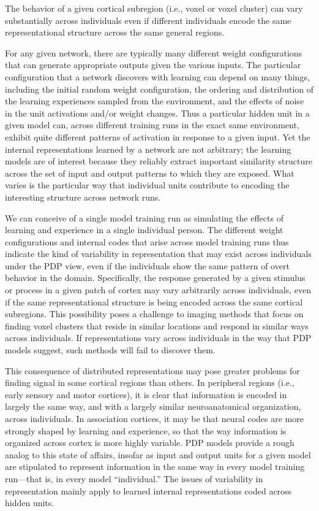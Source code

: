 \begin{APAenumerate}
\item The behavior of a given cortical subregion (i.e., voxel or voxel cluster) can vary substantially across individuals even if different individuals encode the same representational structure across the same general regions.

For any given network, there are typically many different weight configurations that can generate appropriate outputs given the various inputs. The particular configuration that a network discovers with learning can depend on many things, including the initial random weight configuration, the ordering and distribution of the learning experiences sampled from the environment, and the effects of noise in the unit activations and/or weight changes. Thus a particular hidden unit in a given model can, across different training runs in the exact same environment, exhibit quite different patterns of activation in response to a given input. Yet the internal representations learned by a network are not arbitrary; the learning models are of interest because they reliably extract important similarity structure across the set of input and output patterns to which they are exposed. What varies is the particular way that individual units contribute to encoding the interesting structure across network runs. 

We can conceive of a single model training run as simulating the effects of learning and experience in a single individual person. The different weight configurations and internal codes that arise across model training runs thus indicate the kind of variability in representation that may exist across individuals under the PDP view, even if the individuals show the same pattern of overt behavior in the domain. Specifically, the response generated by a given stimulus or process in a given patch of cortex may vary arbitrarily across individuals,  even if the same representational structure is being encoded across the same cortical subregions. This possibility poses a challenge to imaging methods that focus on finding voxel clusters that reside in similar locations and respond in similar ways across individuals. If representations vary across individuals in the way that PDP models suggest, such methods will fail to discover them.

This consequence of distributed representations may pose greater problems for finding signal in some cortical regions than others. In peripheral regions (i.e., early sensory and motor cortices), it is clear that information is encoded in largely the same way, and with a largely similar neuroanatomical organization, across individuals. In association cortices, it may be that neural codes are more strongly shaped by learning and experience, so that the way information is organized across cortex is more highly variable. PDP models provide a rough analog to this state of affairs, insofar as input and output units for a given model are stipulated to represent information in the same way in every model training run---that is, in every model ``individual.'' The issues of variability in representation mainly apply to learned internal representations coded across hidden units.


\end{APAenumerate}
